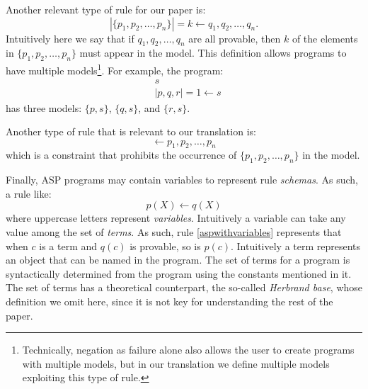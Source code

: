 Another relevant type of rule for our paper is:
\begin{equation*}
    |\{p_1,p_2,\ldots,p_n\}|=k \leftarrow q_1,q_2,\ldots,q_n.
\end{equation*}
Intuitively here we say that if $q_1,q_2,\ldots,q_n$ are all provable, then $k$ of the elements in $\{p_1,p_2,\ldots,p_n\}$ must appear in the model. This definition allows programs to have multiple models\footnote{Technically, negation as failure alone also allows the user to create programs with multiple models, but in our translation we define multiple models exploiting this type of rule.}. For example, the program:
\begin{align*}
    &s\\
    &|{p,q,r}|=1\leftarrow s
\end{align*}
has three models: $\{p,s\}$, $\{q,s\}$, and $\{r,s\}$.

Another type of rule that is relevant to our translation is:
\begin{equation}
    \leftarrow p_1,p_2,\ldots,p_n
\end{equation}
which is a constraint that prohibits the occurrence of $\{p_1,p_2,\ldots,p_n\}$ in the model.

Finally, ASP programs may contain variables to represent rule \emph{schemas}. As such, a rule like:
\begin{equation}\label{aspwithvariables}
    p(X)\leftarrow q(X)
\end{equation}
where uppercase letters represent \emph{variables}. Intuitively a variable can take any value among the set of \emph{terms}. As such, rule \eqref{aspwithvariables} represents that when $c$ is a term and $q(c)$ is provable, so is $p(c)$. Intuitively a term represents an object that can be named in the program. The set of terms for a program is syntactically determined from the program using the constants mentioned in it. The set of terms has a theoretical counterpart, the so-called \emph{Herbrand base}, whose definition we omit here, since it is not key for understanding the rest of the paper.

